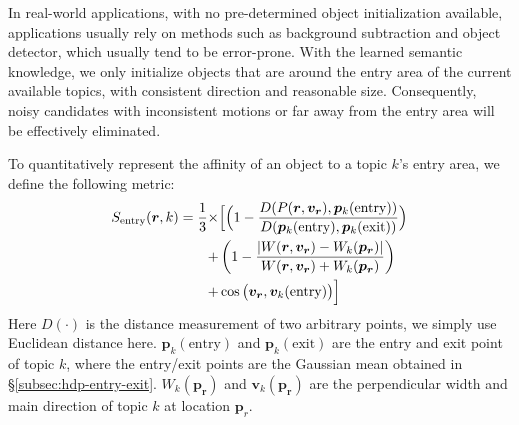     

    In real-world applications, with no pre-determined object initialization available, applications usually rely on methods such as background subtraction and object detector, which usually tend to be error-prone.
    With the learned semantic knowledge, we only initialize objects that are around the entry area of the current available topics, with consistent direction and reasonable size. Consequently, noisy candidates with inconsistent motions or far away from the entry area will be effectively eliminated. 

    To quantitatively represent the affinity of an object to a topic $k$'s entry area, we define the following metric:
    \begin{align}
        \begin{split}
        S_\text{entry}(\bm{r}, k) = \frac{1}{3}\times & \Bigl[\Bigl(1-\frac{D(P(\bm{r}, \bm{v_r}), \bm{p}_k(\text{entry}))}{D(\bm{p}_k(\text{entry}), \bm{p}_k(\text{exit}))}\Bigl) \\
        + & \left(1 - \frac{|W(\bm{r}, \bm{v_r}) - W_k(\bm{p_r})|}{W(\bm{r}, \bm{v_r}) + W_k(\bm{p_r})}\right) \\
        + & \cos\big(\bm{v_r}, \bm{v}_k(\text{entry})\big)\Bigl]\label{eq:entry_score}
        \end{split}
    \end{align}
    Here $D(\cdot)$ is the distance measurement of two arbitrary points, we simply use Euclidean distance here. 
    $\bm{p}_k(\text{entry})$ and $\bm{p}_k(\text{exit})$ are the entry and exit point of topic $k$, where the entry/exit points are the Gaussian mean obtained in \S\ref{subsec:hdp-entry-exit}. 
    $W_k(\bm{p_r})$ and $\bm{v}_k(\bm{p_r})$ are the perpendicular width and main direction of topic $k$ at location $\bm{p}_{r}$.
    

